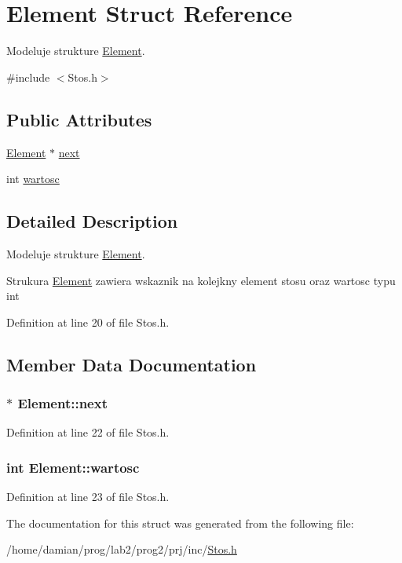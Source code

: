 \hypertarget{struct_element}{\section{Element Struct Reference}
\label{struct_element}
}


Modeluje strukture \hyperlink{struct_element}{Element}.  




{\ttfamily \#include $<$Stos.\-h$>$}

\subsection*{Public Attributes}
\begin{DoxyCompactItemize}
\item 
\hyperlink{struct_element}{Element} $\ast$ \hyperlink{struct_element_aa4abb0d5679fabd8208a4c6525dd1dc8}{next}
\item 
int \hyperlink{struct_element_a6293e5d8101312d7e3bb95688dc7b261}{wartosc}
\end{DoxyCompactItemize}


\subsection{Detailed Description}
Modeluje strukture \hyperlink{struct_element}{Element}. 

Strukura \hyperlink{struct_element}{Element} zawiera wskaznik na kolejkny element stosu oraz wartosc typu int 

Definition at line 20 of file Stos.\-h.



\subsection{Member Data Documentation}
\hypertarget{struct_element_aa4abb0d5679fabd8208a4c6525dd1dc8}{
\subsubsection[{next}]{$\ast$ Element\-::next}}\label{struct_element_aa4abb0d5679fabd8208a4c6525dd1dc8}


Definition at line 22 of file Stos.\-h.

\hypertarget{struct_element_a6293e5d8101312d7e3bb95688dc7b261}{
\subsubsection[{wartosc}]{\setlength{\rightskip}{0pt plus 5cm}int Element\-::wartosc}}\label{struct_element_a6293e5d8101312d7e3bb95688dc7b261}


Definition at line 23 of file Stos.\-h.



The documentation for this struct was generated from the following file\-:\begin{DoxyCompactItemize}
\item 
/home/damian/prog/lab2/prog2/prj/inc/\hyperlink{_stos_8h}{Stos.\-h}\end{DoxyCompactItemize}
